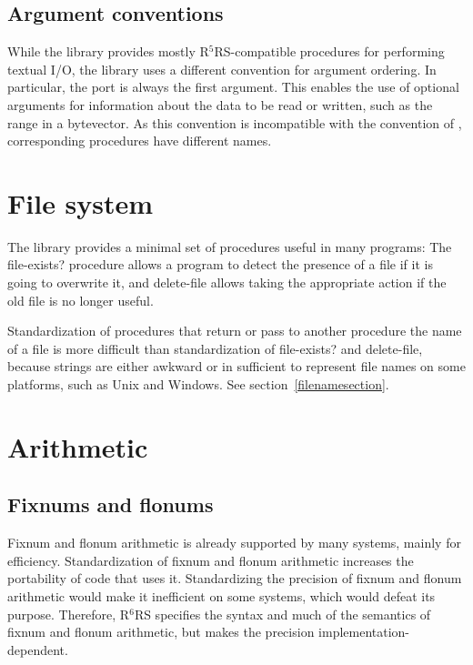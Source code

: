 \documentclass[twoside,twocolumn]{algol60}
\newcommand{\rn}[1]{R$^{#1}$RS}
\begin{document}
\section{Argument conventions}

While the  library provides mostly
\rn{5}-compatible procedures for performing textual I/O, the
 library uses a different convention for
argument ordering.  In particular, the port is always the first
argument.  This enables the use of optional arguments for information
about the data to be read or written, such as the range in a
bytevector.  As this convention is incompatible with the convention of
, corresponding procedures have different
names.

\chapter{File system}

The  library provides a minimal set of procedures
useful in many programs: The {\cf file-exists?} procedure allows a
program to detect the presence of a file if it is going to overwrite
it, and {\cf delete-file} allows taking the appropriate action if the
old file is no longer useful.

Standardization of procedures that return or pass to another procedure
the name of a file is more difficult than standardization of {\cf
  file-exists?} and {\cf delete-file}, because strings are either
awkward or in sufficient to represent file names on some platforms,
such as Unix and Windows.  See section~\ref{filenamesection}.

\chapter{Arithmetic}

\section{Fixnums and flonums}

Fixnum and flonum arithmetic is already supported by many systems,
mainly for efficiency. Standardization of fixnum and flonum arithmetic
increases the portability of code that uses it.  Standardizing the
precision of fixnum and flonum arithmetic would make it inefficient on
some systems, which would defeat its purpose.  Therefore, \rn{6}
specifies the syntax and much of the semantics of fixnum and flonum
arithmetic, but makes the precision implementation-dependent.
\end{document}
